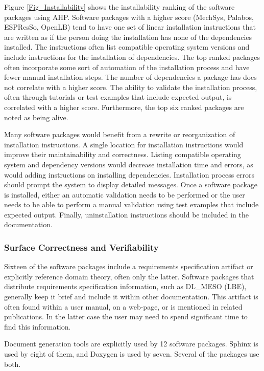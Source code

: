 \documentclass[12pt, notitlepage]{article}
\begin{document}
Figure \ref{Fig_Installability} shows the installability ranking of the software packages using AHP. Software packages with a higher score (MechSys, Palabos, ESPResSo, OpenLB) tend to have one set of linear installation instructions that are written as if the person doing the installation has none of the dependencies installed. The instructions often list compatible operating system versions and include instructions for the installation of dependencies. The top ranked packages often incorporate some sort of automation of the installation process and have fewer manual installation steps. The number of dependencies a package has does not correlate with a higher score. The ability to validate the installation process, often through tutorials or test examples that include expected output, is correlated with a higher score. Furthermore, the top six ranked packages are noted as being alive. 

Many software packages would benefit from a rewrite or reorganization of installation instructions. A single location for installation instructions would improve their maintainability and correctness. Listing compatible operating system and dependency versions would decrease installation time and errors, as would adding instructions on installing dependencies. Installation process errors should prompt the system to display detailed messages. Once a software package is installed, either an automatic validation needs to be performed or the user needs to be able to perform a manual validation using test examples that include expected output. Finally, uninstallation instructions should be included in the documentation. 
 
\subsubsection{Surface Correctness and Verifiability}

Sixteen of the software packages include a requirements specification artifact or explicitly reference domain theory, often only the latter. Software packages that distribute requirements specification information, such as DL\_MESO (LBE), generally keep it brief and include it within other documentation. This artifact is often found within a user manual, on a web-page, or is mentioned in related publications. In the latter case the user may need to spend significant time to find this information. 

Document generation tools are explicitly used by 12 software packages. Sphinx is used by eight of them, and Doxygen is used by seven. Several of the packages use both.
\end{document}
